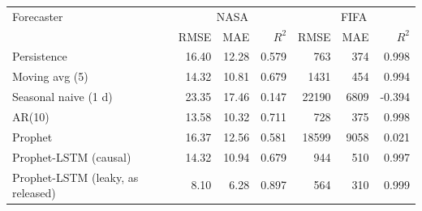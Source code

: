 \begin{tabular}{lrrrrrr}
\toprule
Forecaster & \multicolumn{3}{c}{NASA} & \multicolumn{3}{c}{FIFA} \\
 & RMSE & MAE & $R^2$ & RMSE & MAE & $R^2$ \\
\midrule
Persistence & 16.40 & 12.28 & 0.579 & 763 & 374 & 0.998 \\
Moving avg (5) & 14.32 & 10.81 & 0.679 & 1431 & 454 & 0.994 \\
Seasonal naive (1 d) & 23.35 & 17.46 & 0.147 & 22190 & 6809 & -0.394 \\
AR(10) & 13.58 & 10.32 & 0.711 & 728 & 375 & 0.998 \\
Prophet & 16.37 & 12.56 & 0.581 & 18599 & 9058 & 0.021 \\
Prophet-LSTM (causal) & 14.32 & 10.94 & 0.679 & 944 & 510 & 0.997 \\
Prophet-LSTM (leaky, as released) & 8.10 & 6.28 & 0.897 & 564 & 310 & 0.999 \\
\bottomrule
\end{tabular}

